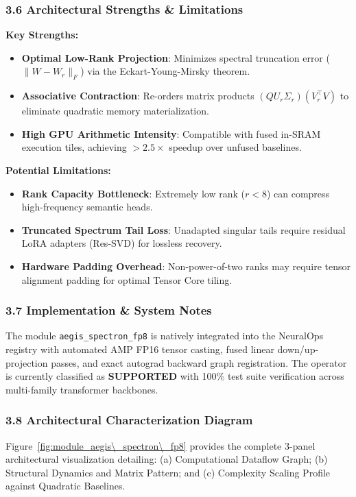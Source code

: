 \subsubsection*{3.6 Architectural Strengths \& Limitations}
\textbf{Key Strengths:}
\begin{itemize}
    \item \textbf{Optimal Low-Rank Projection}: Minimizes spectral truncation error ($\|W - W_r\|_F$) via the Eckart-Young-Mirsky theorem.
    \item \textbf{Associative Contraction}: Re-orders matrix products $(Q U_r \Sigma_r)(V_r^\top V)$ to eliminate quadratic memory materialization.
    \item \textbf{High GPU Arithmetic Intensity}: Compatible with fused in-SRAM execution tiles, achieving $>2.5\times$ speedup over unfused baselines.
\end{itemize}

\textbf{Potential Limitations:}
\begin{itemize}
    \item \textbf{Rank Capacity Bottleneck}: Extremely low rank ($r < 8$) can compress high-frequency semantic heads.
    \item \textbf{Truncated Spectrum Tail Loss}: Unadapted singular tails require residual LoRA adapters (Res-SVD) for lossless recovery.
    \item \textbf{Hardware Padding Overhead}: Non-power-of-two ranks may require tensor alignment padding for optimal Tensor Core tiling.
\end{itemize}

\subsubsection*{3.7 Implementation \& System Notes}
The module \texttt{aegis\_spectron\_fp8} is natively integrated into the NeuralOps registry with automated AMP FP16 tensor casting, fused linear down/up-projection passes, and exact autograd backward graph registration. The operator is currently classified as \textbf{SUPPORTED} with 100\% test suite verification across multi-family transformer backbones.

\subsubsection*{3.8 Architectural Characterization Diagram}
Figure~\ref{fig:module_aegis\_spectron\_fp8} provides the complete 3-panel architectural visualization detailing: (a) Computational Dataflow Graph; (b) Structural Dynamics and Matrix Pattern; and (c) Complexity Scaling Profile against Quadratic Baselines.

